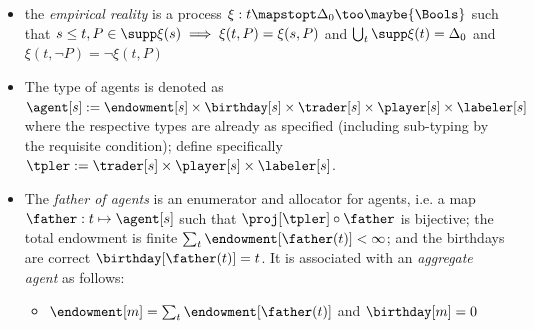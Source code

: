 \begin{definition}
\begin{itemize}
\begin{itemize}
            \begin{itemize}
                \item orders placed: $\change[P,1](t,P)=\lambda\trader(t,P,\price(t,P))$ where $\lambda$ is 1 if the following conditions are met (else 0): for all $P$, $\max_p-\trader(t,P,p)\le \inventory(t,P)$ (you're not selling what you don't have) and $\sum_P\max_p p\trader(t,P,p)\le\inventory(t,\top)$ (you can afford all your purchases)
                \item cost of orders placed: $\change[P,2](t,\top)=-\price(t,P)\change[P,1](t,P)$
                \item the moves played (if $P\in\Sigma$): $\change[P,3](t,P)=-\sum_{l\in\supp{\player(t,P)}}{\intlen{\preimg{\labeler(t,P)}{l}}}$ and $\change[P,4](t,\play{P}{\player(t,P,l)})=\intlen{\preimg{\labeler(t,P)}{l}}$
                \item the opponent's moves (if $P\in\Pi$): $\change[P,5](t,P)=-\sum_{l\in\supp\player(t,P)}{\intlen{\preimg{\labeler[p](t,P)}{l}}}$ and $\change[P,6](t,\play{P}{\player[p](t,P,l)})=\intlen{\preimg{\labeler[p](t,P)}{l}}$
                \item the payout from empirical truth (if $P\in\Delta_0$): if $P\in\supp\xi(t)$, then $\change[P,7](t,P)=-\inventory(t,P)$ and $\change[P,8](t,\xi(t,P))=\inventory(t,P)$
            \end{itemize}
        \end{itemize}
        \item the \emph{empirical reality} is a process $\xi:t\mapstopt\Delta_0\too\maybe{\Bools}$ such that $s\le t,P\in\supp\xi(s)\implies\xi(t,P)=\xi(s,P)$ and $\bigcup_t\supp\xi(t)=\Delta_0$ and $\xi(t,\lnot P)=\lnot\xi(t,P)$
        \item The type of agents is denoted as $\agent[s]:=\endowment[s]\times\birthday[s]\times\trader[s]\times\player[s]\times\labeler[s]$ where the respective types are already as specified (including sub-typing by the requisite condition); define specifically $\tpler:=\trader[s]\times\player[s]\times\labeler[s]$.
        \item The \emph{father of agents} is an enumerator and allocator for agents, i.e. a map $\father:t\mapsto\agent[s]$ such that $\proj[\tpler]\circ\father$ is bijective; the total endowment is finite $\sum_t{\endowment[\father(t)]}<\infty$; and the birthdays are correct $\birthday[\father(t)]=t$. It is associated with an \emph{aggregate agent} as follows:
        \begin{itemize}
            \item $\endowment[m]=\sum_t{\endowment[\father(t)]}$ and $\birthday[m]=0$

\end{itemize}
\end{itemize}
\end{definition}
